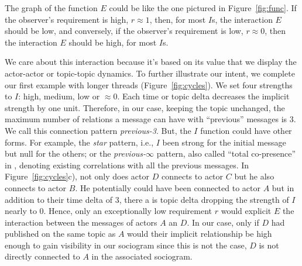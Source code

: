 \documentclass[a4paper,twoside]{article}
\begin{document}



The graph of the function $E$ could be like the one pictured in Figure~\ref{fig:func}.  If the observer's requirement is high, $r\approx{} 1$, then, for most $I$s, the interaction $E$  should be low, and conversely, if the observer's requirement is low, $r \approx{} 0$, then the interaction $E$ should be high, for most $I$s.

We care about this interaction because it's based on its value that we display the actor-actor or topic-topic dynamics.  To further illustrate our intent, we complete our first example with longer threads (Figure~\ref{fig:cycles}).  We set four strengths to $I$: high, medium, low or $\approx 0$.  Each time or topic delta decreases the implicit strength by one unit.  Therefore, in our case, keeping the topic unchanged, the maximum number of relations a message can have with ``previous'' messages is 3.  We call this connection pattern \emph{previous-3}.  But, the $I$ function could have other forms.  For example, the \emph{star} pattern, i.e., $I$ been strong for the initial message but null for the others; or the \emph{previous-}$\infty$ pattern, also called ``total co-presence'' in \cite{Wise2017}, denoting existing correlations with all the previous messages.
In Figure~\ref{fig:cycles}c), not only does actor $D$ connects to actor $C$ but he also connects to actor $B$.  He potentially could have been connected to actor $A$ but in addition to their time delta of 3, there a is topic delta dropping the strength of $I$ nearly to 0.  Hence, only an exceptionally low requirement $r$ would explicit $E$ the interaction between the messages of actors $A$ an $D$.   In our case, only if $D$ had published on the same topic as $A$ would their implicit relationship be high enough to gain visibility in our sociogram since this is not the case, $D$ is not directly connected to $A$ in the associated sociogram.
\end{document}
